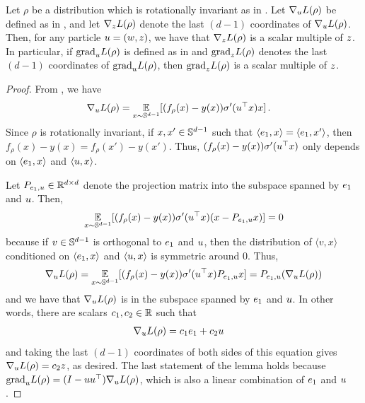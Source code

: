\begin{lemma}\label{lemma:gradient_is_scaler_multiple_of_z}
Let $\rho$ be a distribution which is rotationally invariant as in . Let $\nabla_u L(\rho)$ be defined as in , and let $\nabla_z L(\rho)$ denote the last $(d - 1)$ coordinates of $\nabla_u L(\rho)$. Then, for any particle $u = (w, z)$, we have that $\nabla_z L(\rho)$ is a scalar multiple of $z$. In particular, if ${\textup{grad}}_{u} L(\rho)$ is defined as in  and ${\textup{grad}}_{z} L(\rho)$ denotes the last $(d - 1)$ coordinates of ${\textup{grad}}_{u} L(\rho)$, then ${\textup{grad}}_{z} L(\rho)$ is a scalar multiple of $z$.
\end{lemma}
\begin{proof}
From , we have
\begin{align}
\nabla_u L(\rho)
& = \operatorname*{\mathbb{E}}_{x \sim \mathbb{S}^{d - 1}} [(f_\rho(x) - y(x)) \sigma'(u^\top x) x] \,.
\end{align}
Since $\rho$ is rotationally invariant, if $x, x' \in \mathbb{S}^{d - 1}$ such that $\langle e_1, x \rangle = \langle e_1, x' \rangle$, then $f_\rho(x) - y(x) = f_\rho(x') - y(x')$. Thus, $(f_\rho(x) - y(x)) \sigma'(u^\top x)$ only depends on $\langle e_1, x \rangle$ and $\langle u, x \rangle$. 

Let $P_{e_1, u} \in \mathbb{R}^{d \times d}$ denote the projection matrix into the subspace spanned by $e_1$ and $u$. Then,
\begin{align}
\operatorname*{\mathbb{E}}_{x \sim \mathbb{S}^{d - 1}} [(f_\rho(x) - y(x)) \sigma'(u^\top x) (x - P_{e_1, u} x)] = 0
\end{align}
because if $v \in \mathbb{S}^{d - 1}$ is orthogonal to $e_1$ and $u$, then the distribution of $\langle v, x \rangle$ conditioned on $\langle e_1, x \rangle$ and $\langle u, x \rangle$ is symmetric around $0$. Thus,
\begin{align}
\nabla_{u} L(\rho)
 = \operatorname*{\mathbb{E}}_{x \sim \mathbb{S}^{d - 1}} [(f_\rho(x) - y(x)) \sigma'(u^\top x) P_{e_1, u} x] = P_{e_1, u} (\nabla_{u} L(\rho))
\end{align}
and we have that $\nabla_{u} L(\rho)$ is in the subspace spanned by $e_1$ and $u$. In other words, there are scalars $c_1, c_2 \in \mathbb{R}$ such that
\begin{align}
\nabla_{u} L(\rho)
& = c_1 e_1 + c_2 u
\end{align}
and taking the last $(d - 1)$ coordinates of both sides of this equation gives $\nabla_{u} L(\rho) = c_2 z$, as desired. The last statement of the lemma holds because ${\textup{grad}}_{u} L(\rho) = (I - u u^\top) \nabla_{u} L(\rho)$, which is also a linear combination of $e_1$ and $u$.
\end{proof}

